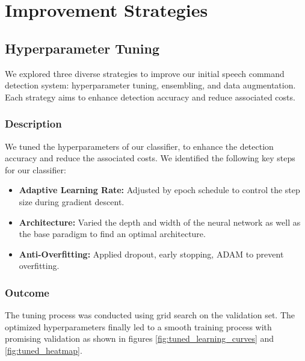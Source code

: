 \section{Improvement Strategies}
\subsection{Hyperparameter Tuning}
We explored three diverse strategies to improve our initial speech command detection system: hyperparameter tuning, ensembling, and data augmentation. Each strategy aims to enhance detection accuracy and reduce associated costs.
\subsubsection{Description}
We tuned the hyperparameters of our classifier, to enhance the detection accuracy and reduce the associated costs. We identified the following key steps for our classifier:
\begin{itemize}
  \item \textbf{Adaptive Learning Rate:} Adjusted by epoch schedule to control the step size during gradient descent.
  \item \textbf{Architecture:} Varied the depth and width of the neural network as well as the base paradigm to find an optimal architecture.
  \item \textbf{Anti-Overfitting:} Applied dropout, early stopping, ADAM to prevent overfitting.
\end{itemize}


\subsubsection{Outcome}
The tuning process was conducted using grid search on the validation set.
The optimized hyperparameters finally led to a smooth training process with promising validation as shown in figures
\ref{fig:tuned_learning_curves} and \ref{fig:tuned_heatmap}.


